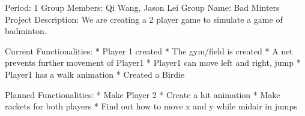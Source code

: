 Period: 1
Group Members: Qi Wang, Jason Lei
Group Name: Bad Minters
Project Description: We are creating a 2 player game to simulate a game of badminton. 

Current Functionalities:
* Player 1 created
* The gym/field is created
* A net prevents further movement of Player1
* Player1 can move left and right, jump
* Player1 has a walk animation
* Created a Birdie


Planned Functionalities: 
* Make Player 2
* Create a hit animation
* Make rackets for both players
* Find out how to move x and  y while midair in jumps





